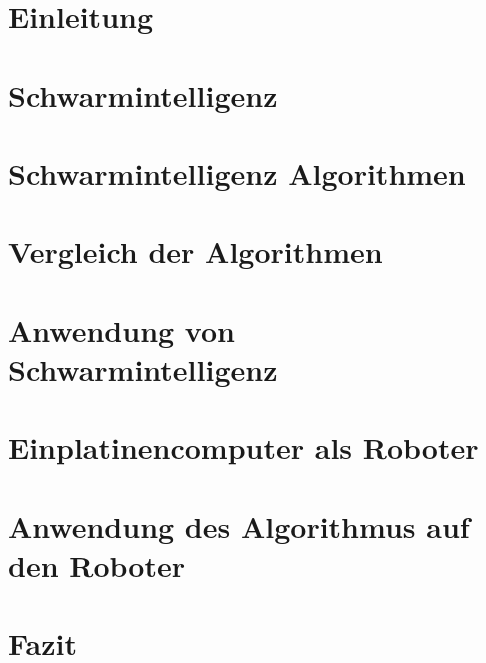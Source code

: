 \documentclass[12pt, a4paper]{report}
\begin{document}


\tableofcontents
\listoffigures
\listoftables
\listoflistings

\chapter{Einleitung}

\chapter{Schwarmintelligenz}

\chapter{Schwarmintelligenz Algorithmen}
\label{ch:algo}

\chapter{Vergleich der Algorithmen}

\chapter{Anwendung von Schwarmintelligenz}
\label{ch:anwendungAlgo}

\chapter{Einplatinencomputer als Roboter}
\label{ch:einplatinen}

\chapter{Anwendung des Algorithmus auf den Roboter}

\chapter{Fazit}


\printbibliography
\end{document}
